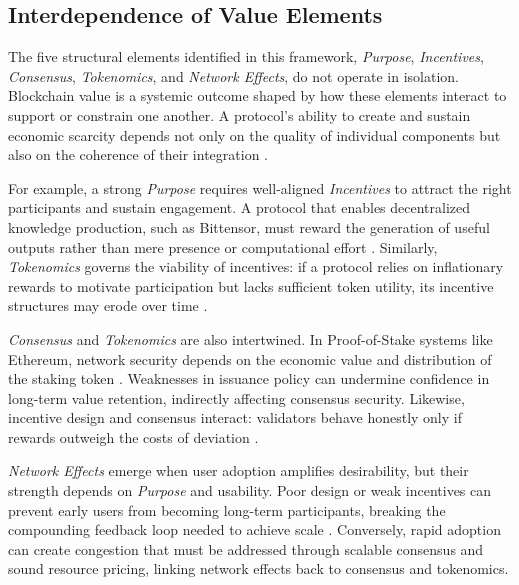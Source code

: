 \documentclass[12pt]{article}
\begin{document}
\subsection{Interdependence of Value Elements}

The five structural elements identified in this framework, \textit{Purpose}, \textit{Incentives}, \textit{Consensus}, \textit{Tokenomics}, and \textit{Network Effects}, do not operate in isolation. Blockchain value is a systemic outcome shaped by how these elements interact to support or constrain one another. A protocol’s ability to create and sustain economic scarcity depends not only on the quality of individual components but also on the coherence of their integration \citep{gans2019economics, canidio2021tokens, catalini2020some}.


For example, a strong \textit{Purpose} requires well-aligned \textit{Incentives} to attract the right participants and sustain engagement. A protocol that enables decentralized knowledge production, such as Bittensor, must reward the generation of useful outputs rather than mere presence or computational effort \citep{rao2023bittensor}. Similarly, \textit{Tokenomics} governs the viability of incentives: if a protocol relies on inflationary rewards to motivate participation but lacks sufficient token utility, its incentive structures may erode over time \citep{cong2021tokenomics, huberman2021monetizing}.

\textit{Consensus} and \textit{Tokenomics} are also intertwined. In Proof-of-Stake systems like Ethereum, network security depends on the economic value and distribution of the staking token \citep{buterin2022proof}. Weaknesses in issuance policy can undermine confidence in long-term value retention, indirectly affecting consensus security. Likewise, incentive design and consensus interact: validators behave honestly only if rewards outweigh the costs of deviation \citep{saleh2021blockchain}.

\textit{Network Effects} emerge when user adoption amplifies desirability, but their strength depends on \textit{Purpose} and usability. Poor design or weak incentives can prevent early users from becoming long-term participants, breaking the compounding feedback loop needed to achieve scale \citep{gans2019economics, urquhart2022ethereum}. Conversely, rapid adoption can create congestion that must be addressed through scalable consensus and sound resource pricing, linking network effects back to consensus and tokenomics.
\end{document}
